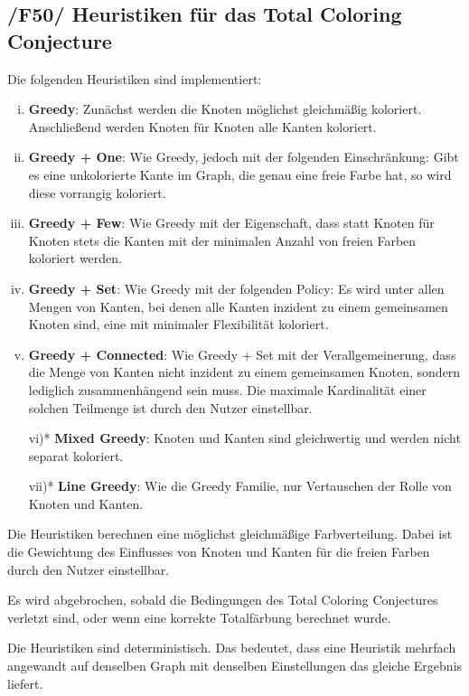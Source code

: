 \documentclass{article}
\begin{document}
	\subsection*{/F50/ Heuristiken für das Total Coloring Conjecture} \label{f50} 
	Die folgenden Heuristiken sind implementiert:
	\begin{enumerate}[i)]
		\item{\textbf{Greedy}: Zunächst werden die Knoten möglichst gleichmäßig koloriert. Anschließend werden Knoten für Knoten alle Kanten koloriert.}
		\item{\textbf{Greedy + One}: Wie Greedy, jedoch mit der folgenden Einschränkung: Gibt es eine unkolorierte Kante im Graph, die genau eine freie Farbe hat, so wird diese vorrangig koloriert.}
		\item{\textbf{Greedy + Few}: Wie Greedy mit der Eigenschaft, dass statt Knoten für Knoten stets die Kanten mit der minimalen Anzahl von freien Farben koloriert werden.}
		\item{\textbf{Greedy + Set}: Wie Greedy mit der folgenden Policy: Es wird unter allen Mengen von Kanten, bei denen alle Kanten inzident zu einem gemeinsamen Knoten sind, eine mit minimaler Flexibilität koloriert.}
		\item{\textbf{Greedy + Connected}: Wie Greedy + Set mit der Verallgemeinerung, dass die Menge von Kanten nicht inzident zu einem gemeinsamen Knoten, sondern lediglich zusammenhängend sein muss. Die maximale Kardinalität einer solchen Teilmenge ist durch den Nutzer einstellbar.}
		\item[vi)*]{\textbf{Mixed Greedy}: Knoten und Kanten sind gleichwertig und werden nicht separat koloriert.}
		\item[vii)*]{\textbf{Line Greedy}: Wie die Greedy Familie, nur Vertauschen der Rolle von Knoten und Kanten.}
	\end{enumerate}
	Die Heuristiken berechnen eine möglichst gleichmäßige Farbverteilung. Dabei ist die Gewichtung des Einflusses von Knoten und Kanten für die freien Farben durch den Nutzer einstellbar.
	
	Es wird abgebrochen, sobald die Bedingungen des Total Coloring Conjectures verletzt sind, oder wenn eine korrekte Totalfärbung berechnet wurde. 
	
	Die Heuristiken sind deterministisch. Das bedeutet, dass eine Heuristik mehrfach angewandt auf denselben Graph mit denselben Einstellungen das gleiche Ergebnis liefert.
	
\end{document}
